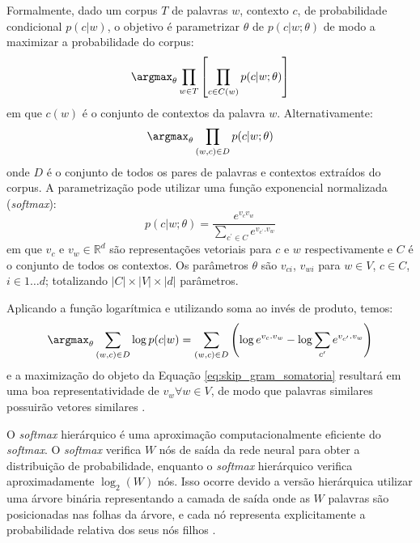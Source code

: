 Formalmente, dado um corpus $T$ de palavras $w$, contexto $c$, de probabilidade condicional $p(c|w)$, o objetivo é parametrizar $\theta$ de $p(c|w;\theta)$ de modo a maximizar a probabilidade do corpus:
\begin{equation}
    \label{eq:skip_gram_full}
    \argmax_\theta \prod_{w \in T} \left [ \prod_{c \in C(w)} p({c}|{w};\theta) \right ]
\end{equation}
em que $c(w)$ é o conjunto de contextos da palavra $w$. Alternativamente:
\begin{equation}
    \label{eq:skip_gram}
    \argmax_\theta \prod_{(w,c) \in D} p({c}|{w};\theta)
\end{equation}
onde $D$ é o conjunto de todos os pares de palavras e contextos extraídos do corpus. A parametrização pode utilizar uma função exponencial normalizada (\textit{softmax}):
\begin{equation}
    \label{eq:skip_gram_p_c_dado_w}
    p(c|w;\theta) = \frac{e^{v_c v_w}}{\sum_{c^\prime \in C} e^{v_{c^\prime}.v_w}}
\end{equation}
em que $v_c$ e $v_w \in \mathbb{R}^d$ são representações vetoriais para $c$ e $w$ respectivamente e $C$ é o conjunto de todos os contextos. Os parâmetros $\theta$ são $v_{ci}$, $v_{wi}$ para $w \in V$, $c \in C$, $i \in 1 \dots d$; totalizando $|C| \times |V| \times |d|$ parâmetros. 

Aplicando a função logarítmica e utilizando soma ao invés de produto, temos:
\begin{equation}
    \label{eq:skip_gram_somatoria}
    \argmax_\theta \sum_{(w,c) \in D} \log p(c|w) = \sum_{(w,c) \in D} \left ( \log e^{v_c . v_w} - \log \sum_{c^\prime} e^{v_{c^\prime} . v_w} \right )
\end{equation}
e a maximização do objeto da Equação \ref{eq:skip_gram_somatoria} resultará em uma boa representatividade de $v_w \forall w \in V$, de modo que palavras similares possuirão vetores similares \cite{Goldberg2014word2vecED}.

O \textit{softmax} hierárquico é uma aproximação computacionalmente eficiente do \textit{softmax}. O \textit{softmax} verifica $W$ nós de saída da rede neural para obter a distribuição de probabilidade, enquanto o \textit{softmax} hierárquico verifica aproximadamente $\log_2 (W)$ nós. Isso ocorre devido a versão hierárquica utilizar uma árvore binária representando a camada de saída onde as $W$ palavras são posicionadas nas folhas da árvore, e cada nó representa explicitamente a probabilidade relativa dos seus nós filhos \cite{Mikolov2013DistributedRepresentations}.


